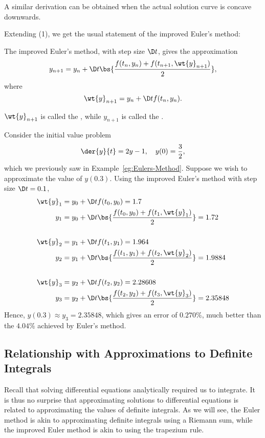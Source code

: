 A similar derivation can be obtained when the actual solution curve is concave downwards.

Extending (1), we get the usual statement of the improved Euler's method:

\begin{recipe}
    The improved Euler's method, with step size $\D t$, gives the approximation \[y_{n+1} = y_n + \D t \bs{\frac{f(t_n, y_n) + f(t_{n+1}, \wt{y}_{n+1})}{2}},\] where \[\wt{y}_{n+1} = y_n + \D t f(t_n, y_n).\]
\end{recipe}

\begin{definition}
    $\wt{y}_{n + 1}$ is called the , while $y_{n+1}$ is called the .
\end{definition}

\begin{example}
    Consider the initial value problem \[\der{y}{t} = 2y - 1, \quad y(0) = \frac32,\] which we previously saw in Example~\ref{eg:Eulers-Method}. Suppose we wish to approximate the value of $y(0.3)$. Using the improved Euler's method with step size $\D t = 0.1$,
    \begin{align*}
        \wt{y}_1 &= y_0 + \D t f(t_0, y_0) = 1.7\\
        y_1 &= y_0 + \D t \bs{\frac{f(t_0, y_0) + f(t_1, \wt{y}_1)}{2}} = 1.72 \\ \\
        \wt{y}_2 &= y_1 + \D t f(t_1, y_1) = 1.964\\
        y_2 &= y_1 + \D t \bs{\frac{f(t_1, y_1) + f(t_2, \wt{y}_2)}{2}} = 1.9884 \\ \\
        \wt{y}_3 &= y_2 + \D t f(t_2, y_2) = 2.28608\\
        y_3 &= y_2 + \D t \bs{\frac{f(t_2, y_2) + f(t_3, \wt{y}_3)}{2}} = 2.35848
    \end{align*}
    Hence, $y(0.3) \approx y_3 = 2.35848$, which gives an error of $0.270\%$, much better than the $4.04\%$ achieved by Euler's method.
\end{example}

\subsection{Relationship with Approximations to Definite Integrals}

Recall that solving differential equations analytically required us to integrate. It is thus no surprise that approximating solutions to differential equations is related to approximating the values of definite integrals. As we will see, the Euler method is akin to approximating definite integrals using a Riemann sum, while the improved Euler method is akin to using the trapezium rule.

